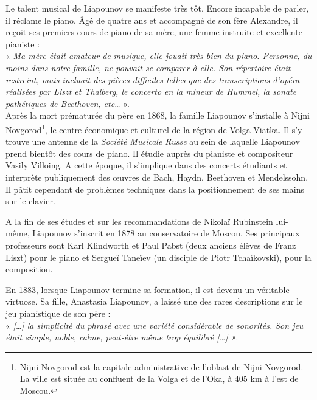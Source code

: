 Le talent musical de Liapounov se manifeste très tôt. Encore incapable de parler, il réclame le piano. Âgé de quatre ans et accompagné de son fère Alexandre, il reçoit ses premiers cours de piano de sa mère, une femme instruite et excellente pianiste :\\
« \emph{Ma mère était amateur de musique, elle jouait très bien du piano. Personne, du moins dans notre famille, ne pouvait se comparer à elle. Son répertoire était restreint, mais incluait des pièces difficiles telles que des transcriptions d'opéra réalisées par Liszt et Thalberg, le concerto en \emph{la} mineur de Hummel, la sonate pathétiques de Beethoven, etc\dots{}} ».\\

Après la mort prématurée du père en 1868, la famille Liapounov s'installe à Nijni Novgorod\footnote{Nijni Novgorod est la capitale administrative de l'oblast de Nijni Novgorod. La ville est située au confluent de la Volga et de l'Oka, à 405 km à l'est de Moscou.}, le centre économique et culturel de la région de Volga-Viatka. 
Il s'y trouve une antenne de la \emph{Société Musicale Russe} au sein de laquelle Liapounov prend bientôt des cours de piano. Il étudie auprès du pianiste et compositeur Vasily Villoing. A cette époque, il s'implique dans des concerts étudiants et interprète publiquement des œuvres de Bach, Haydn, Beethoven et Mendelssohn. Il pâtit cependant de problèmes techniques dans la positionnement de ses mains sur le clavier.

\newpage

A la fin de ses études et sur les recommandations de Nikolaï Rubinstein lui-même, Liapounov s'inscrit en 1878 au conservatoire de Moscou. Ses principaux professeurs sont Karl Klindworth et Paul Pabst (deux anciens élèves de Franz Liszt) pour le piano et Sergueï Taneïev (un disciple de Piotr Tchaïkovski), pour la composition.

En 1883, lorsque Liapounov termine sa formation, il est devenu un véritable virtuose. Sa fille, Anastasia Liapounov, a laissé une des rares descriptions sur le jeu pianistique de son père :\\
« \emph{[\dots] la simplicité du phrasé avec une variété considérable de sonorités. Son jeu était simple, noble, calme, peut-être même trop équilibré [\dots] »}.\\

